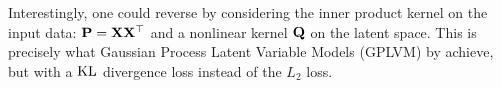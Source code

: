 \begin{remark}
    Interestingly, one could reverse  by considering the inner product kernel on the input data: ${\mathbf{P}} = {\mathbf{X}} {\mathbf{X}}^\top$ and a nonlinear kernel ${\mathbf{Q}}$ on the latent space. This is precisely what Gaussian Process Latent Variable Models (GPLVM) by \cite{lawrence2005probabilistic} achieve, but with a $\operatorname{KL}$ divergence loss instead of the $L_2$ loss.
\end{remark}
